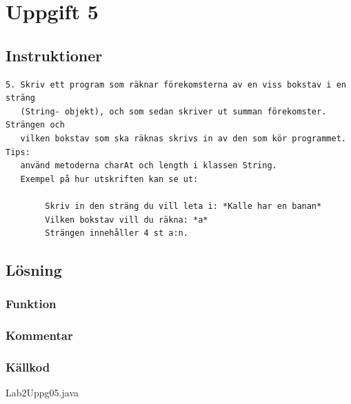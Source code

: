 \section{Uppgift 5}\label{sec:uppg05}

\subsection{Instruktioner}
\begin{verbatim}
5. Skriv ett program som räknar förekomsterna av en viss bokstav i en sträng
   (String- objekt), och som sedan skriver ut summan förekomster. Strängen och
   vilken bokstav som ska räknas skrivs in av den som kör programmet. Tips:
   använd metoderna charAt och length i klassen String.
   Exempel på hur utskriften kan se ut:

        Skriv in den sträng du vill leta i: *Kalle har en banan*
        Vilken bokstav vill du räkna: *a*
        Strängen innehåller 4 st a:n.
\end{verbatim}


\subsection{Lösning}
\subsubsection{Funktion}

\subsubsection{Kommentar}


\subsubsection{Källkod}
\caption{Lab2Uppg05.java}
\label{src:uppg05}


